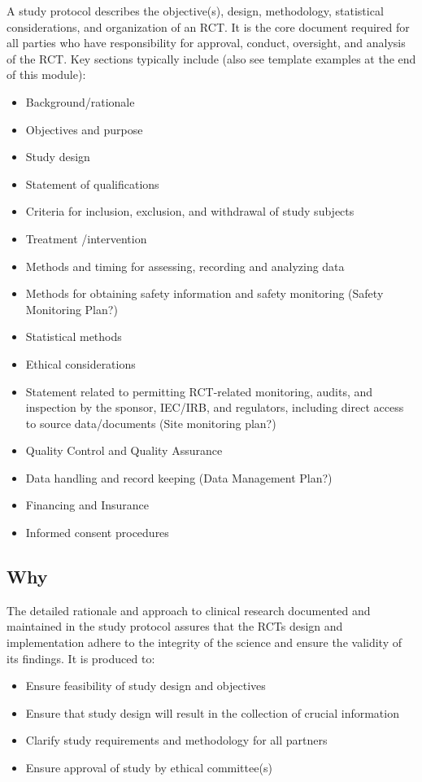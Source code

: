 \documentclass[]{book}
\providecommand{\tightlist}{%
  \setlength{\itemsep}{0pt}\setlength{\parskip}{0pt}}
\theoremstyle{definition}
\theoremstyle{definition}
\theoremstyle{definition}
\theoremstyle{remark}
\begin{document}
A study protocol describes the objective(s), design, methodology,
statistical considerations, and organization of an RCT. It is the core
document required for all parties who have responsibility for approval,
conduct, oversight, and analysis of the RCT. Key sections typically
include (also see template examples at the end of this module):

\begin{itemize}
\tightlist
\item
  Background/rationale
\item
  Objectives and purpose
\item
  Study design
\item
  Statement of qualifications
\item
  Criteria for inclusion, exclusion, and withdrawal of study subjects
\item
  Treatment /intervention
\item
  Methods and timing for assessing, recording and analyzing data
\item
  Methods for obtaining safety information and safety monitoring (Safety
  Monitoring Plan?)
\item
  Statistical methods
\item
  Ethical considerations
\item
  Statement related to permitting RCT-related monitoring, audits, and
  inspection by the sponsor, IEC/IRB, and regulators, including direct
  access to source data/documents (Site monitoring plan?)
\item
  Quality Control and Quality Assurance
\item
  Data handling and record keeping (Data Management Plan?)
\item
  Financing and Insurance
\item
  Informed consent procedures
\end{itemize}

\subsection{Why}\label{why-11}

The detailed rationale and approach to clinical research documented and
maintained in the study protocol assures that the RCTs design and
implementation adhere to the integrity of the science and ensure the
validity of its findings. It is produced to:

\begin{itemize}
\tightlist
\item
  Ensure feasibility of study design and objectives
\item
  Ensure that study design will result in the collection of crucial
  information
\item
  Clarify study requirements and methodology for all partners
\item
  Ensure approval of study by ethical committee(s)
\end{itemize}
\end{document}
